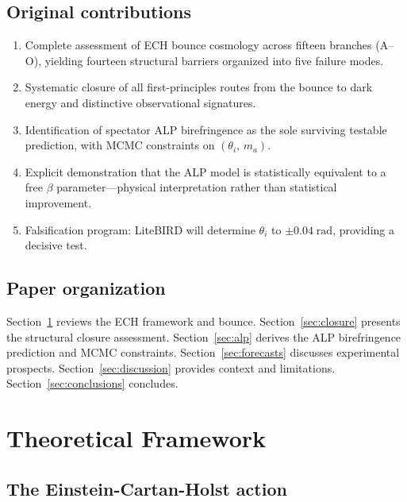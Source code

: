 \documentclass[aps,prd,twocolumn,superscriptaddress,showpacs,preprintnumbers,nofootinbib,longbibliography,floatfix]{revtex4-2}
\begin{document}
\subsection{Original contributions}

\begin{enumerate}[leftmargin=*]
\item Complete assessment of ECH bounce cosmology across fifteen branches
  (A--O), yielding fourteen structural barriers organized into five failure
  modes.
\item Systematic closure of all first-principles routes from the bounce to
  dark energy and distinctive observational signatures.
\item Identification of spectator ALP birefringence as the sole surviving
  testable prediction, with MCMC constraints on $(\theta_i,\,m_a)$.
\item Explicit demonstration that the ALP model is statistically equivalent
  to a free $\beta$ parameter---physical interpretation rather than
  statistical improvement.
\item Falsification program: LiteBIRD will determine $\theta_i$ to
  $\pm 0.04\;\mathrm{rad}$, providing a decisive test.
\end{enumerate}

\subsection{Paper organization}

Section~\ref{sec:framework} reviews the ECH framework and bounce.
Section~\ref{sec:closure} presents the structural closure assessment.
Section~\ref{sec:alp} derives the ALP birefringence prediction and MCMC
constraints.  Section~\ref{sec:forecasts} discusses experimental prospects.
Section~\ref{sec:discussion} provides context and limitations.
Section~\ref{sec:conclusions} concludes.


\section{Theoretical Framework}\label{sec:framework}

\subsection{The Einstein-Cartan-Holst action}
\end{document}
